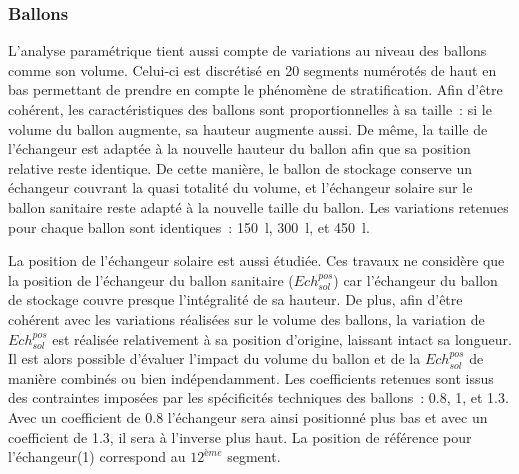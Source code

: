 \subsubsection{Ballons} %
\label{ssub:ballons}
L’analyse paramétrique tient aussi compte de variations au niveau des ballons comme
son volume. Celui-ci est discrétisé en \num{20} segments numérotés de haut en bas
permettant de prendre en compte le phénomène de stratification.
Afin d’être cohérent, les caractéristiques des ballons sont proportionnelles à sa taille~:
si le volume du ballon augmente, sa hauteur augmente aussi.
De même, la taille de l’échangeur est adaptée à la nouvelle hauteur du ballon
afin que sa position relative reste identique. De cette manière, le ballon de
stockage conserve un échangeur couvrant la quasi totalité du volume, et
l’échangeur solaire sur le ballon sanitaire reste adapté à la nouvelle taille du
ballon. Les variations retenues pour chaque ballon sont identiques~:
\SI{150}{l}, \SI{300}{l}, et \SI{450}{l}.

La position de l’échangeur solaire est aussi étudiée. Ces travaux ne considère que
la position de l’échangeur du ballon sanitaire ($Ech_{sol}^{pos}$) car l’échangeur du
ballon de stockage couvre presque l’intégralité de sa hauteur. De plus, afin d’être
cohérent avec les variations réalisées sur le volume des ballons, la variation de
$Ech_{sol}^{pos}$ est réalisée relativement à sa position d’origine, laissant intact sa
longueur. Il est alors possible d’évaluer l’impact du volume du ballon et de la $Ech_{sol}^{pos}$
de manière combinés ou bien indépendamment. Les coefficients
retenues sont issus des contraintes imposées par les spécificités techniques des ballons~:
\num{0.8}, \num{1}, et \num{1.3}. Avec un coefficient de \num{0.8} l’échangeur sera ainsi
positionné plus bas et avec un coefficient de \num{1.3}, il sera à l’inverse plus haut. La
position de référence pour l’échangeur(\num{1}) correspond au $12^{ème}$ segment.


